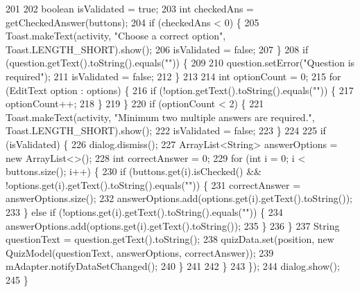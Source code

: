 \begin{DoxyCode}
201 
202                 \textcolor{keywordtype}{boolean} isValidated = \textcolor{keyword}{true};
203                 \textcolor{keywordtype}{int} checkedAns = getCheckedAnswer(buttons);
204                 \textcolor{keywordflow}{if} (checkedAns < 0) \{
205                     Toast.makeText(activity, \textcolor{stringliteral}{"Choose a correct option"}, Toast.LENGTH\_SHORT).show();
206                     isValidated = \textcolor{keyword}{false};
207                 \}
208                 \textcolor{keywordflow}{if} (question.getText().toString().equals(\textcolor{stringliteral}{""})) \{
209 
210                     question.setError(\textcolor{stringliteral}{"Question is required"});
211                     isValidated = \textcolor{keyword}{false};
212                 \}
213 
214                 \textcolor{keywordtype}{int} optionCount = 0;
215                 \textcolor{keywordflow}{for} (EditText option : options) \{
216                     \textcolor{keywordflow}{if} (!option.getText().toString().equals(\textcolor{stringliteral}{""})) \{
217                         optionCount++;
218                     \}
219                 \}
220                 \textcolor{keywordflow}{if} (optionCount < 2) \{
221                     Toast.makeText(activity, \textcolor{stringliteral}{"Minimum two multiple answers are required."}, 
      Toast.LENGTH\_SHORT).show();
222                     isValidated = \textcolor{keyword}{false};
223                 \}
224 
225                 \textcolor{keywordflow}{if} (isValidated) \{
226                     dialog.dismiss();
227                     ArrayList<String> answerOptions = \textcolor{keyword}{new} ArrayList<>();
228                     \textcolor{keywordtype}{int} correctAnswer = 0;
229                     \textcolor{keywordflow}{for} (\textcolor{keywordtype}{int} i = 0; i < buttons.size(); i++) \{
230                         \textcolor{keywordflow}{if} (buttons.get(i).isChecked() && !options.get(i).getText().toString().equals(\textcolor{stringliteral}{""})) 
      \{
231                             correctAnswer = answerOptions.size();
232                             answerOptions.add(options.get(i).getText().toString());
233                         \} \textcolor{keywordflow}{else} \textcolor{keywordflow}{if} (!options.get(i).getText().toString().equals(\textcolor{stringliteral}{""})) \{
234                             answerOptions.add(options.get(i).getText().toString());
235                         \}
236                     \}
237                     String questionText = question.getText().toString();
238                     quizData.set(position, \textcolor{keyword}{new} QuizModel(questionText, answerOptions, correctAnswer));
239                     mAdapter.notifyDataSetChanged();
240                 \}
241 
242             \}
243         \});
244         dialog.show();
245     \}
\end{DoxyCode}
